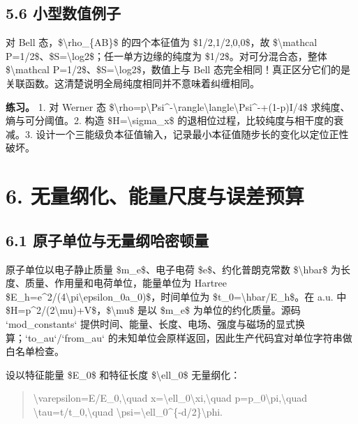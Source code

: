 \documentclass[UTF8,openany,11pt,fontset=fandol]{ctexbook}
\begin{document}
\subsection{\texorpdfstring{\textbf{5.6
小型数值例子}}{5.6 小型数值例子}}\label{ux5c0fux578bux6570ux503cux4f8bux5b50-2}

对 Bell 态，\$\textbackslash rho\_\{AB\}\$ 的四个本征值为
\$1/2,1/2,0,0\$，故 \$\textbackslash mathcal
P=1/2\$、\$S=\textbackslash log2\$；任一单方边缘的纯度为
\$1/2\$。对可分混合态，整体 \$\textbackslash mathcal
P=1/2\$、\$S=\textbackslash log2\$，数值上与 Bell
态完全相同！真正区分它们的是关联函数。这清楚说明全局纯度相同并不意味着纠缠相同。

\textbf{练习。} 1. 对 Werner 态
\$\textbackslash rho=p\textbar\textbackslash Psi\^{}-\textbackslash rangle\textbackslash langle\textbackslash Psi\^{}-\textbar+(1-p)I/4\$
求纯度、熵与可分阈值。2. 构造 \$H=\textbackslash sigma\_x\$
的退相位过程，比较纯度与相干度的衰减。3.
设计一个三能级负本征值输入，记录最小本征值随步长的变化以定位正性破坏。

\section{\texorpdfstring{\textbf{6.
无量纲化、能量尺度与误差预算}}{6. 无量纲化、能量尺度与误差预算}}\label{ux65e0ux91cfux7eb2ux5316ux80fdux91cfux5c3aux5ea6ux4e0eux8befux5deeux9884ux7b97}

\subsection{\texorpdfstring{\textbf{6.1
原子单位与无量纲哈密顿量}}{6.1 原子单位与无量纲哈密顿量}}\label{ux539fux5b50ux5355ux4f4dux4e0eux65e0ux91cfux7eb2ux54c8ux5bc6ux987fux91cf}

原子单位以电子静止质量 \$m\_e\$、电子电荷 \$e\$、约化普朗克常数
\$\textbackslash hbar\$ 为长度、质量、作用量和电荷单位，能量单位为
Hartree
\$E\_h=e\^{}2/(4\textbackslash pi\textbackslash epsilon\_0a\_0)\$，时间单位为
\$t\_0=\textbackslash hbar/E\_h\$。在 a.u. 中
\$H=p\^{}2/(2\textbackslash mu)+V\$，\$\textbackslash mu\$ 是以 \$m\_e\$
为单位的约化质量。源码 `mod\_constants`
提供时间、能量、长度、电场、强度与磁场的显式换算；`to\_au`/`from\_au`
的未知单位会原样返回，因此生产代码宜对单位字符串做白名单检查。

设以特征能量 \$E\_0\$ 和特征长度 \$\textbackslash ell\_0\$ 无量纲化：

\begin{quote}
\textbackslash varepsilon=E/E\_0,\textbackslash quad
x=\textbackslash ell\_0\textbackslash xi,\textbackslash quad
p=p\_0\textbackslash pi,\textbackslash quad
\textbackslash tau=t/t\_0,\textbackslash quad
\textbackslash psi=\textbackslash ell\_0\^{}\{-d/2\}\textbackslash phi.
\end{quote}
\end{document}
